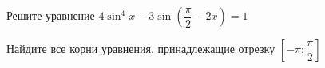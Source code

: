 \begin{ex}
	\begin{condition}
		\begin{enumcols}[label=\asbuk*)]
			\item Решите уравнение \( 4\sin^4 x - 3\sin{\left(\dfrac{\pi}{2}-2x\right)}= 1 \)
			\item Найдите все корни уравнения, принадлежащие отрезку \( \left[-\pi;\dfrac{\pi}{2}\right] \)
		\end{enumcols}
	\end{condition}
\end{ex}